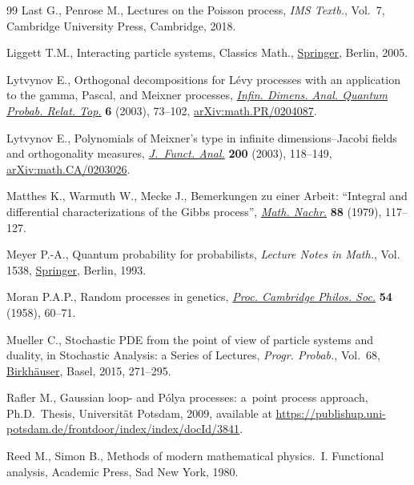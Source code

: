\documentclass[pdftex]{sigma}
\numberwithin{equation}{section}
\newcommand{\1}{\mathbbm{1}}
\begin{document}
\begin{thebibliography}{99}
Last G., Penrose M., Lectures on the {P}oisson process, \textit{IMS Textb.},
 Vol.~7, Cambridge University Press, Cambridge, 2018.

Liggett T.M., Interacting particle systems, Classics Math., \href{https://doi.org/10.1007/b138374}{Springer}, Berlin,
 2005.

Lytvynov E., Orthogonal decompositions for {L}\'evy processes with an
 application to the gamma, {P}ascal, and {M}eixner processes, \href{https://doi.org/10.1142/S0219025703001031}{\textit{Infin.
 Dimens. Anal. Quantum Probab. Relat. Top.}} \textbf{6} (2003), 73--102,
 \href{https://arxiv.org/abs/math.PR/0204087}{arXiv:math.PR/0204087}.

Lytvynov E., Polynomials of {M}eixner's type in infinite dimensions--{J}acobi
 fields and orthogonality measures, \href{https://doi.org/10.1016/S0022-1236(02)00081-2}{\textit{J.~Funct. Anal.}} \textbf{200}
 (2003), 118--149, \href{https://arxiv.org/abs/math.CA/0203026}{arXiv:math.CA/0203026}.

Matthes K., Warmuth W., Mecke J., Bemerkungen zu einer {A}rbeit: ``{I}ntegral
 and differential characterizations of the {G}ibbs process'', \href{https://doi.org/10.1002/mana.19790880110}{\textit{Math.
 Nachr.}} \textbf{88} (1979), 117--127.

Meyer P.-A., Quantum probability for probabilists, \textit{Lecture Notes in
 Math.}, Vol. 1538, \href{https://doi.org/10.1007/978-3-662-21558-6}{Springer}, Berlin, 1993.

Moran P.A.P., Random processes in genetics, \href{https://doi.org/10.1017/s0305004100033193}{\textit{Proc. Cambridge Philos.
 Soc.}} \textbf{54} (1958), 60--71.

Mueller C., Stochastic {PDE} from the point of view of particle systems and
 duality, in Stochastic Analysis: a Series of Lectures, \textit{Progr.
 Probab.}, Vol.~68, \href{https://doi.org/10.1007/978-3-0348-0909-2_10}{Birkh\"auser}, Basel, 2015, 271--295.

Rafler M., Gaussian loop- and {P}\'olya processes: a~point process approach,
 Ph.D.~Thesis, {U}niversit\"at {P}otsdam, 2009, available at
 \url{https://publishup.uni-potsdam.de/frontdoor/index/index/docId/3841}.

Reed M., Simon B., Methods of modern mathematical physics.~{I}. Functional
 analysis, Academic Press, Sad New York, 1980.


\end{thebibliography}
\end{document}
